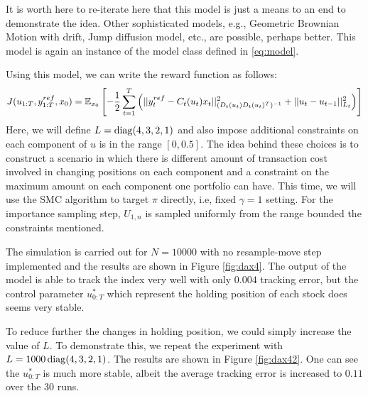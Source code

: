 It is worth here to re-iterate here that this model is just a means to an end to demonstrate the idea. Other sophisticated models, e.g., Geometric Brownian Motion with drift, Jump diffusion model, etc., are possible, perhaps better. This model is again an instance of the model class defined in \eqref{eq:model}.

Using this model, we can write the reward function as follows:
\begin{equation}
  J(u_{1:T},y^{ref}_{1:T}, x_0) = \operatorname{\mathbb{E}}_{x_0}\left[ -\dfrac{1}{2}\displaystyle\sum^T_{t=1}\left(\vert\vert y^{ref}_t - C_t(u_t)x_t \vert\vert^2_{(D_t(u_t)D_t(u_t)^T)^{-1}}  + \vert\vert u_t - u_{t-1} \vert\vert^2_{L_t}\right) \right]
\end{equation}
Here, we will define $L = \operatorname{diag}(4,3,2,1)$ and also impose additional constraints on each component of $u$ is in the range $[0,0.5]$. The idea behind these choices is to construct a scenario in which there is different amount of transaction cost involved in changing positions on each component and a constraint on the maximum amount on each component one portfolio can have. This time, we will use the SMC algorithm to target $\pi$ directly, i.e, fixed $\gamma=1$ setting. For the importance sampling step, $U_{1,n}$ is sampled uniformly from the range bounded the constraints mentioned. 

The simulation is carried out for $N=10000$ with no resample-move step implemented and the results are shown in Figure \ref{fig:dax4}. The output of the model is able to track the index very well with only $0.004$ tracking error, but the control parameter $u^*_{0:T}$ which represent the holding position of each stock does seems very stable.

To reduce further the changes in holding position, we could simply increase the value of $L$. To demonstrate this, we repeat the experiment with $L = 1000\operatorname{diag}(4,3,2,1)$. The results are shown in Figure \ref{fig:dax42}. One can see the $u^*_{0:T}$ is much more stable, albeit the average tracking error is increased to $0.11$ over the $30$ runs.

